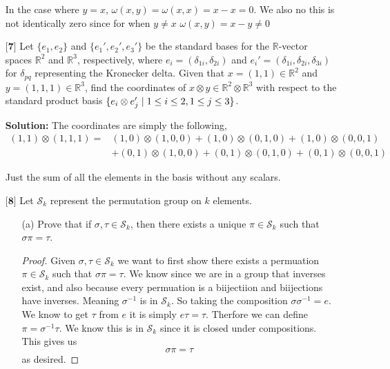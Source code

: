 \documentclass[12pt]{article}
\begin{document}
\begin{itemize}
    In the case where $y = x$, $\omega(x,y) = \omega(x,x) = x-x  =0$. We also no this is not identically zero since for when $y\neq x$ $\omega(x,y) = x-y \neq 0$
    

    \item[$\textbf{[7]}$]
    Let $\{e_1,e_2\}$ and $\{e_1',e_2',e_3'\}$ be the standard bases for the $\mathbb{R}$-vector spaces $\mathbb{R}^2$ and $\mathbb{R}^3$, respectively, where \newline $e_i = (\delta_{1i},\delta_{2i})$ and $e_i' = (\delta_{1i},\delta_{2i},\delta_{3i})$ for $\delta_{pq}$ representing the Kronecker delta. Given that $x = (1,1) \in \mathbb{R}^2$ and $y = (1,1,1) \in \mathbb{R}^3$, find the coordinates of $x \otimes y \in \mathbb{R}^2 \otimes \mathbb{R}^3$ with respect to the standard product basis $\{e_i \otimes e_j' \hspace{.1cm} | \hspace{.1cm} 1 \leq i \leq 2, 1 \leq j \leq 3\}$. 
    
    \textbf{Solution:}
    The coordinates are simply the following,
    \begin{align*}
    (1,1)\otimes (1,1,1) = &(1,0) \otimes (1,0,0) + (1,0)\otimes(0,1,0) + (1,0)\otimes(0,0,1) \\ &+ (0,1)\otimes(1,0,0) + (0,1)\otimes(0,1,0) + (0,1)\otimes(0,0,1)
    \end{align*}

    Just the sum of all the elements in the basis without any scalars. 
    \vspace{.5cm}

   

    \item[$\textbf{[8]}$]
    Let $\mathcal{S}_k$ represent the permutation group on $k$ elements. 
    \begin{itemize}
    
    \vspace{.3cm}
    \item[(a)]
    Prove that if $\sigma,\tau \in \mathcal{S}_k$, then there exists a unique $\pi \in \mathcal{S}_k$ such that $\sigma\pi = \tau$. 

    \begin{proof}
        Given $\sigma, \tau \in \mathcal{S}_k$ we want to first show there exists a permuation $\pi\in \mathcal{S}_k$ such that $\sigma \pi = \tau$. We know since we are in a group that inverses exist, and also because every permuation is a biijectiion and biijections have inverses. Meaning $\sigma^{-1}$ is in $\mathcal{S}_k$. So taking the composition $\sigma \sigma^{-1} = e$. We know to get $\tau$ from $e$ it is simply $e\tau = \tau$. Therfore we can define $\pi = \sigma^{-1}\tau$. We know this is in $\mathcal{S}_k$ since it is closed under compositions. This gives us 
        \[\sigma\pi = \tau\] as desired. 


\end{proof}
\end{itemize}
\end{itemize}
\end{document}
